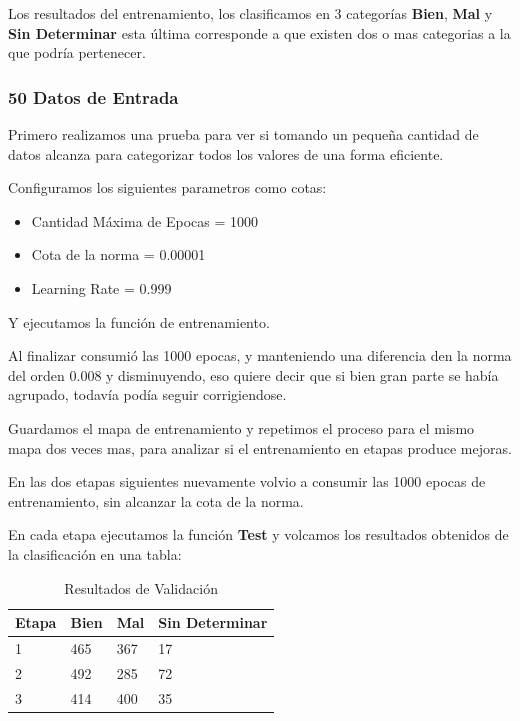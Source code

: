 Los resultados del entrenamiento, los clasificamos en 3 categorías \textbf{Bien}, \textbf{Mal}
y \textbf{Sin Determinar} esta última corresponde a que existen dos o mas categorias a la que
podría pertenecer.



\subsubsection{50 Datos de Entrada}

Primero realizamos una prueba para ver si tomando un pequeña cantidad de datos alcanza para
categorizar todos los valores de una forma eficiente.

Configuramos los siguientes parametros como cotas:

\begin{itemize}
	\item Cantidad Máxima de Epocas = 1000
	\item Cota de la norma = 0.00001
	\item Learning Rate = 0.999
\end{itemize}


Y ejecutamos la función de entrenamiento.

Al finalizar consumió las 1000 epocas, y manteniendo una diferencia den la norma del orden 0.008 
y disminuyendo, eso quiere decir que si bien gran parte se había agrupado, todavía podía seguir
corrigiendose.

Guardamos el mapa de entrenamiento y repetimos el proceso para el mismo mapa dos veces mas,
para analizar si el entrenamiento en etapas produce mejoras.

En las dos etapas siguientes nuevamente volvio a consumir las 1000 epocas de entrenamiento,
sin alcanzar la cota de la norma.

En cada etapa ejecutamos la función \textbf{Test} y volcamos los resultados obtenidos 
de la clasificación en una tabla:


\begin{table}[htbp]
	\begin{center}
	\begin{tabular}{|l|l|l|l|}
		\hline
		Etapa & Bien & Mal & Sin Determinar 	\\
							\hline \hline
		1     & 465  & 367 & 17 		\\ \hline
		2     & 492  & 285 & 72 		\\ \hline
		3     & 414  & 400 & 35			\\ \hline
	\end{tabular}
	\caption{Resultados de Validación}
	\label{tabla:entrenamiento 50 entradas}
	\end{center}
\end{table}

